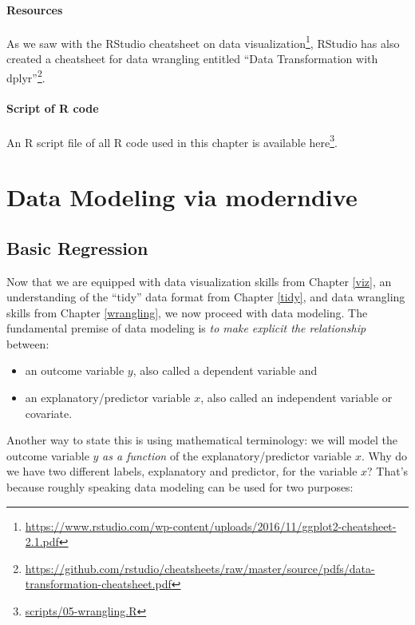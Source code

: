 \documentclass[12pt,]{krantz}
\providecommand{\tightlist}{%
  \setlength{\itemsep}{0pt}\setlength{\parskip}{0pt}}
\renewcommand{\href}[2]{#2\footnote{\url{#1}}}
\begin{document}
\subsection{Resources}\label{resources-1}

As we saw with the RStudio cheatsheet on
\href{https://www.rstudio.com/wp-content/uploads/2016/11/ggplot2-cheatsheet-2.1.pdf}{data
visualization}, RStudio has also created a cheatsheet for data wrangling
entitled
\href{https://github.com/rstudio/cheatsheets/raw/master/source/pdfs/data-transformation-cheatsheet.pdf}{``Data
Transformation with dplyr''}.

\subsection{Script of R code}\label{script-of-r-code-2}

An R script file of all R code used in this chapter is available
\href{scripts/05-wrangling.R}{here}.

\part{Data Modeling via
moderndive}\label{part-data-modeling-via-moderndive}

\chapter{Basic Regression}\label{regression}

Now that we are equipped with data visualization skills from Chapter
\ref{viz}, an understanding of the ``tidy'' data format from Chapter
\ref{tidy}, and data wrangling skills from Chapter \ref{wrangling}, we
now proceed with data modeling. The fundamental premise of data modeling
is \emph{to make explicit the relationship} between:

\begin{itemize}
\tightlist
\item
  an outcome variable \(y\), also called a dependent variable and
\item
  an explanatory/predictor variable \(x\), also called an independent
  variable or covariate.
\end{itemize}

Another way to state this is using mathematical terminology: we will
model the outcome variable \(y\) \emph{as a function} of the
explanatory/predictor variable \(x\). Why do we have two different
labels, explanatory and predictor, for the variable \(x\)? That's
because roughly speaking data modeling can be used for two purposes:
\end{document}
